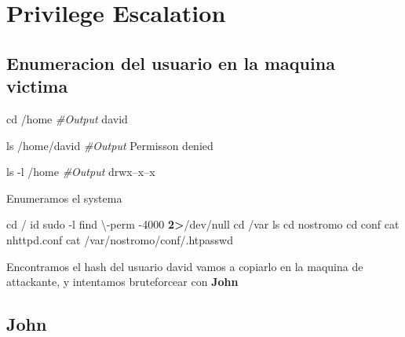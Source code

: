 \documentclass{assets/ipesethesis}
\newenvironment{Shaded}{\begin{snugshade}}{\end{snugshade}}
\newcommand{\BuiltInTok}[1]{#1}
\newcommand{\CommentTok}[1]{\textcolor[rgb]{0.56,0.35,0.01}{\textit{#1}}}
\newcommand{\ExtensionTok}[1]{#1}
\newcommand{\FunctionTok}[1]{\textcolor[rgb]{0.00,0.00,0.00}{#1}}
\newcommand{\NormalTok}[1]{#1}
\newcommand{\OperatorTok}[1]{\textcolor[rgb]{0.81,0.36,0.00}{\textbf{#1}}}
\begin{document}
\hypertarget{privilege-escalation-1}{%
\section*{Privilege Escalation}\label{privilege-escalation-1}}

\hypertarget{enumeracion-del-usuario-en-la-maquina-victima-1}{%
\subsection*{Enumeracion del usuario en la maquina victima}\label{enumeracion-del-usuario-en-la-maquina-victima-1}}

\begin{Shaded}
\begin{Highlighting}[]
\BuiltInTok{cd}\NormalTok{ /home}
\CommentTok{#Output}
\ExtensionTok{david}

\FunctionTok{ls}\NormalTok{ /home/david}
\CommentTok{#Output}
\ExtensionTok{Permisson}\NormalTok{ denied}

\FunctionTok{ls}\NormalTok{ -l /home}
\CommentTok{#Output}
\ExtensionTok{drwx--x--x}
\end{Highlighting}
\end{Shaded}

Enumeramos el systema

\begin{Shaded}
\begin{Highlighting}[]
\BuiltInTok{cd}\NormalTok{ /}
\FunctionTok{id}
\FunctionTok{sudo}\NormalTok{ -l}
\FunctionTok{find}\NormalTok{ \textbackslash{}-perm -4000 }\OperatorTok{2>}\NormalTok{/dev/null}
\BuiltInTok{cd}\NormalTok{ /var}
\FunctionTok{ls}
\BuiltInTok{cd}\NormalTok{ nostromo}
\BuiltInTok{cd}\NormalTok{ conf}
\FunctionTok{cat}\NormalTok{ nhttpd.conf}
\FunctionTok{cat}\NormalTok{ /var/nostromo/conf/.htpasswd}
\end{Highlighting}
\end{Shaded}

Encontramos el hash del usuario david vamos a copiarlo en la maquina de attackante, y intentamos bruteforcear con \textbf{John}

\hypertarget{john}{%
\subsection*{John}\label{john}}
\end{document}
